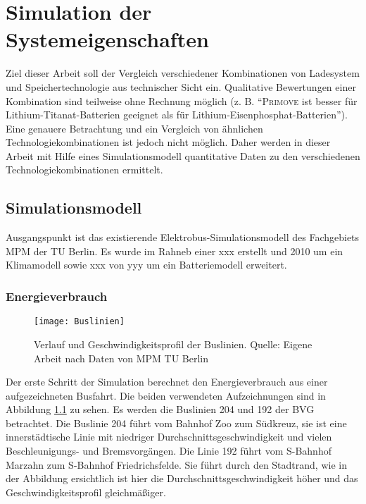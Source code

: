 \chapter{Simulation der Systemeigenschaften}
\label{chap4}
Ziel dieser Arbeit soll der Vergleich verschiedener Kombinationen von Ladesystem und Speichertechnologie aus technischer Sicht ein. Qualitative Bewertungen einer Kombination sind teilweise ohne Rechnung möglich (z. B. "`\textsc{Primove} ist besser für Lithium-Titanat-Batterien geeignet als für Lithium-Eisenphosphat-Batterien"'). Eine genauere Betrachtung und ein Vergleich von ähnlichen Technologiekombinationen ist jedoch nicht möglich. Daher werden in dieser Arbeit mit Hilfe eines Simulationsmodell quantitative Daten zu den verschiedenen Technologiekombinationen ermittelt.

\section{Simulationsmodell}
 Ausgangspunkt ist das existierende Elektrobus-Simulationsmodell des Fachgebiets MPM der TU Berlin. Es wurde im Rahneb einer xxx erstellt und 2010 um ein Klimamodell sowie xxx von yyy um ein Batteriemodell erweitert.

\subsection{Energieverbrauch}

\begin{figure}\centering
	\texttt{[image: Buslinien]}
	\caption[Verlauf und Geschwindigkeitsprofil der Buslinien]{Verlauf und Geschwindigkeitsprofil der Buslinien. Quelle: Eigene Arbeit nach Daten von MPM TU Berlin}
	\label{Buslinien}
\end{figure}

Der erste Schritt der Simulation berechnet den Energieverbrauch aus einer aufgezeichneten Busfahrt. Die beiden verwendeten Aufzeichnungen sind in Abbildung \ref{Buslinien} zu sehen. Es werden die Buslinien 204 und 192 der BVG betrachtet. Die Buslinie 204 führt vom Bahnhof Zoo zum Südkreuz, sie ist eine innerstädtische Linie mit niedriger Durchschnittsgeschwindigkeit und vielen Beschleunigungs- und Bremsvorgängen. Die Linie 192 führt vom S-Bahnhof Marzahn zum S-Bahnhof Friedrichsfelde. Sie führt durch den Stadtrand, wie in der Abbildung ersichtlich ist hier die Durchschnittsgeschwindigkeit höher und das Geschwindigkeitsprofil gleichmäßiger.

